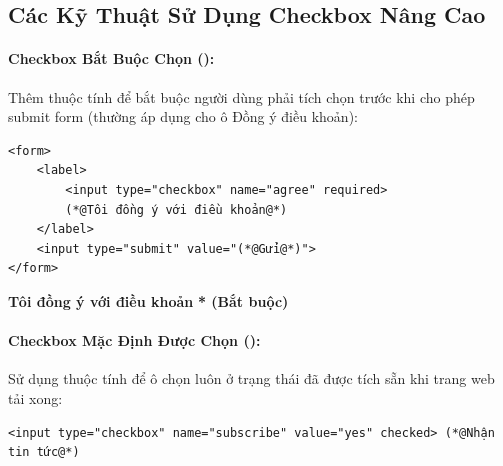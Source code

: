 \subsection{Các Kỹ Thuật Sử Dụng Checkbox Nâng Cao}

\paragraph{Checkbox Bắt Buộc Chọn ():}
Thêm thuộc tính  để bắt buộc người dùng phải tích chọn trước khi cho phép submit form (thường áp dụng cho ô Đồng ý điều khoản):

\begin{codeWindow}
\begin{lstlisting}[language=HTML5]
<form>
    <label>
        <input type="checkbox" name="agree" required> 
        (*@Tôi đồng ý với điều khoản@*)
    </label>
    <input type="submit" value="(*@Gửi@*)">
</form>
\end{lstlisting}
\end{codeWindow}

\begin{browserWindow}
\sffamily\small
{} \; \textbf{Tôi đồng ý với điều khoản} \quad \textcolor{accentOrange}{\small\textbf{* (Bắt buộc)}} \\[6pt]
\end{browserWindow}

\paragraph{Checkbox Mặc Định Được Chọn ():}
Sử dụng thuộc tính  để ô chọn luôn ở trạng thái đã được tích sẵn khi trang web tải xong:

\begin{codeWindow}
\begin{lstlisting}[language=HTML5]
<input type="checkbox" name="subscribe" value="yes" checked> (*@Nhận tin tức@*)
\end{lstlisting}
\end{codeWindow}

